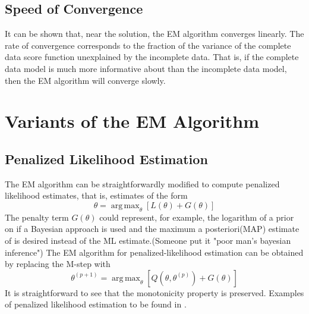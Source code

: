 \documentclass[11pt]{article}
\DeclareMathOperator*{\argmax}{arg\,max}
\begin{document}
\subsection{Speed of Convergence}
It can be shown that, near the solution, the EM algorithm converges linearly\cite{ADempsterEM}. The rate of convergence corresponds to the fraction of the variance of the complete data score function unexplained by the incomplete data. That is, if the complete data model is much more informative about than the incomplete data model, then the EM algorithm will converge slowly.
\section{Variants of the EM Algorithm}
\subsection{Penalized Likelihood Estimation}
The EM algorithm can be straightforwardly modified to compute penalized likelihood estimates, that is, estimates of the form
\begin{equation}
\theta = \argmax_{\theta}[L(\theta)+G(\theta)]
\end{equation}
The penalty term $G(\theta)$ could represent, for example, the logarithm of a prior on if a Bayesian approach is used and the maximum a posteriori(MAP) estimate of is desired instead of the ML estimate.(Someone put it "poor man’s bayesian inference\cite{LifeAfter}") The EM algorithm for penalized-likelihood estimation can be obtained by replacing the M-step with
\begin{equation}
\theta^{(p+1)}=\argmax_{\theta}[Q(\theta, \theta^{(p)}) +G(\theta)]
\end{equation}
It is straightforward to see that the monotonicity property is preserved. Examples of penalized likelihood estimation to be found in \cite{penalized}.



\end{document}
